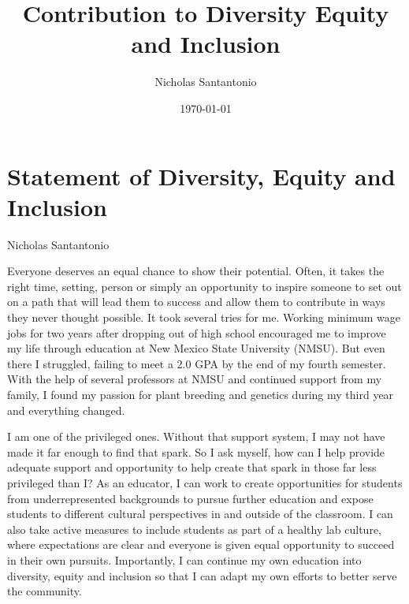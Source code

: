 \documentclass[11pt]{article}
\title{Contribution to Diversity Equity and Inclusion}
\author{Nicholas Santantonio}
\date{\today}
\begin{document}
\section*{\centering Statement of Diversity, Equity and Inclusion}
\begin{center} Nicholas Santantonio \end{center}





Everyone deserves an equal chance to show their potential. Often, it takes the right time, setting, person or simply an opportunity to inspire someone to set out on a path that will lead them to success and allow them to contribute in ways they never thought possible. It took several tries for me. Working minimum wage jobs for two years after dropping out of high school encouraged me to improve my life through education at New Mexico State University (NMSU). But even there I struggled, failing to meet a 2.0 GPA by the end of my fourth semester. With the help of several professors at NMSU and continued support from my family, I found my passion for plant breeding and genetics during my third year and everything changed.

I am one of the privileged ones. Without that support system, I may not have made it far enough to find that spark. So I ask myself, how can I help provide adequate support and opportunity to help create that spark in those far less privileged than I? As an educator, I can work to create opportunities for students from underrepresented backgrounds to pursue further education and expose students to different cultural perspectives in and outside of the classroom. I can also take active measures to include students as part of a healthy lab culture, where expectations are clear and everyone is given equal opportunity to succeed in their own pursuits. Importantly, I can continue my own education into diversity, equity and inclusion so that I can adapt my own efforts to better serve the community. 
\end{document}
